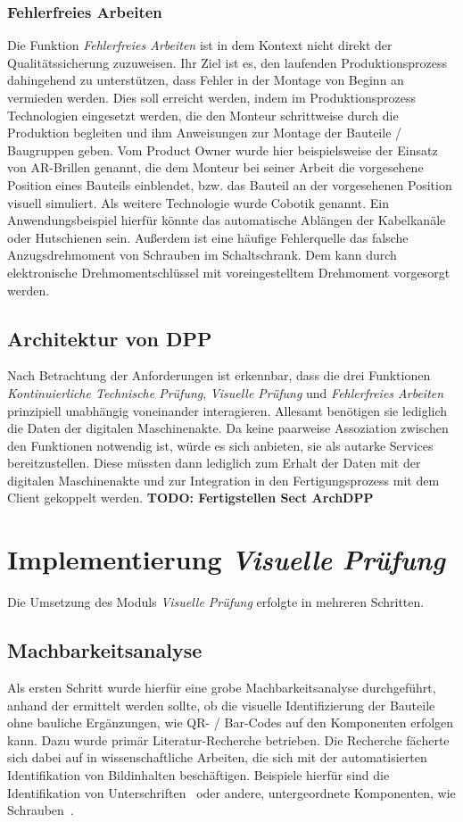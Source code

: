 \documentclass[
    type=Projektarbeit,
    status=draft, %
    language=german, %
    bibengine=bibtex,
]{unibwm-inf-thesis}
\newcommand{\todo}[1]{\textbf{TODO: #1}}
\begin{document}
    \subsection{Fehlerfreies Arbeiten}\label{subsec:fehlerfreies-arbeiten}
    Die Funktion \textit{Fehlerfreies Arbeiten} ist in dem Kontext nicht direkt der Qualitätssicherung zuzuweisen.
    Ihr Ziel ist es, den laufenden Produktionsprozess dahingehend zu unterstützen, dass Fehler in der Montage von
    Beginn an vermieden werden.
    Dies soll erreicht werden, indem im Produktionsprozess Technologien eingesetzt werden, die den Monteur schrittweise
    durch die Produktion begleiten und ihm Anweisungen zur Montage der Bauteile / Baugruppen geben.
    Vom Product Owner wurde hier beispielsweise der Einsatz von AR-Brillen genannt, die dem Monteur bei seiner Arbeit
    die vorgesehene Position eines Bauteils einblendet, bzw. das Bauteil an der vorgesehenen Position visuell simuliert.
    Als weitere Technologie wurde Cobotik genannt.
    Ein Anwendungsbeispiel hierfür könnte das automatische Ablängen der Kabelkanäle oder Hutschienen sein.
    Außerdem ist eine häufige Fehlerquelle das falsche Anzugsdrehmoment von Schrauben im Schaltschrank.
    Dem kann durch elektronische Drehmomentschlüssel mit voreingestelltem Drehmoment vorgesorgt werden.


    \section{Architektur von DPP}
    Nach Betrachtung der Anforderungen ist erkennbar, dass die drei Funktionen \textit{Kontinuierliche Technische
    Prüfung}, \textit{Visuelle Prüfung} und \textit{Fehlerfreies Arbeiten} prinzipiell unabhängig voneinander interagieren.
    Allesamt benötigen sie lediglich die Daten der digitalen Maschinenakte.
    Da keine paarweise Assoziation zwischen den Funktionen notwendig ist, würde es sich anbieten, sie als autarke Services
    bereitzustellen.
    Diese müssten dann lediglich zum Erhalt der Daten mit der digitalen Maschinenakte und zur Integration in den
    Fertigungsprozess mit dem Client gekoppelt werden.
    \todo{Fertigstellen Sect ArchDPP}


    \chapter{Implementierung \textit{Visuelle Prüfung}}
    Die Umsetzung des Moduls \textit{Visuelle Prüfung} erfolgte in mehreren Schritten.
    \section{Machbarkeitsanalyse}
    Als ersten Schritt wurde hierfür eine grobe Machbarkeitsanalyse durchgeführt, anhand der ermittelt werden sollte,
    ob die visuelle Identifizierung der Bauteile ohne bauliche Ergänzungen, wie QR- / Bar-Codes auf den Komponenten erfolgen kann.
    Dazu wurde primär Literatur-Recherche betrieben.
    Die Recherche fächerte sich dabei auf in wissenschaftliche Arbeiten, die sich mit der automatisierten Identifikation von Bildinhalten beschäftigen.
    Beispiele hierfür sind die Identifikation von Unterschriften~\cite{Munich2003} oder andere, untergeordnete Komponenten, wie Schrauben~\cite{Lehr2019}.
\end{document}
